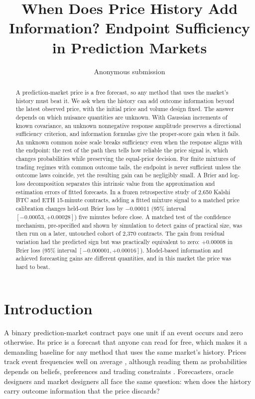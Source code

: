 \documentclass[runningheads]{llncs}
\begin{document}
\title{When Does Price History Add Information? Endpoint Sufficiency in Prediction Markets}
\author{Anonymous submission}
\institute{}
\maketitle
\begin{abstract}
A prediction-market price is a free forecast, so any method that uses the market's history must beat it. We ask when the history can add outcome information beyond the latest observed price, with the initial price and volume design fixed. The answer depends on which nuisance quantities are unknown. With Gaussian increments of known covariance, an unknown nonnegative response amplitude preserves a directional sufficiency criterion, and information formulas give the proper-score gain when it fails. An unknown common noise scale breaks sufficiency even when the response aligns with the endpoint: the rest of the path then tells how reliable the price signal is, which changes probabilities while preserving the equal-prior decision. For finite mixtures of trading regimes with common outcome tails, the endpoint is never sufficient unless the outcome laws coincide, yet the resulting gain can be negligibly small. A Brier and log-loss decomposition separates this intrinsic value from the approximation and estimation errors of fitted forecasts. In a frozen retrospective study of 2,650 Kalshi BTC and ETH 15-minute contracts, adding a fitted mixture signal to a matched price calibration changes held-out Brier loss by $-0.00011$ (95\% interval $[-0.00053,+0.00028]$) five minutes before close. A matched test of the confidence mechanism, pre-specified and shown by simulation to detect gains of practical size, was then run on a later, untouched cohort of 2,370 contracts. The gain from residual variation had the predicted sign but was practically equivalent to zero: $+0.00008$ in Brier loss (95\% interval $[-0.000001,+0.00016]$). Model-based information and achieved forecasting gains are different quantities, and in this market the price was hard to beat.
\end{abstract}

\section{Introduction}
A binary prediction-market contract pays one unit if an event occurs and zero otherwise. Its price is a forecast that anyone can read for free, which makes it a demanding baseline for any method that uses the same market's history. Prices track event frequencies well on average \cite{wolfers2004prediction}, although reading them as probabilities depends on beliefs, preferences and trading constraints \cite{manski2006interpreting,wolfers2006interpreting}. Forecasters, oracle designers and market designers all face the same question: when does the history carry outcome information that the price discards?
\end{document}
